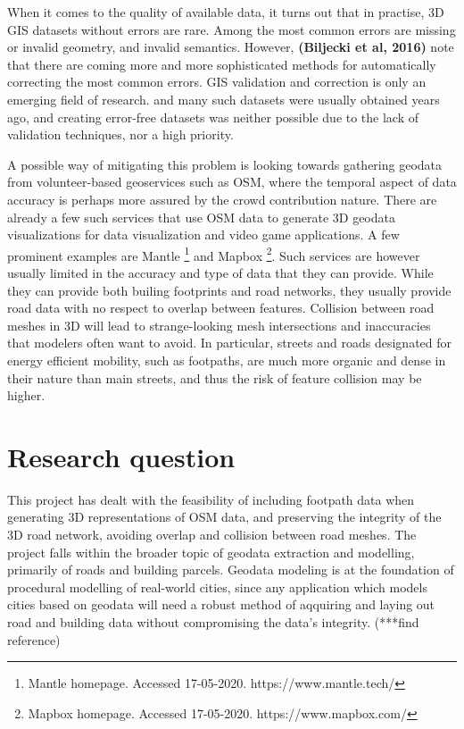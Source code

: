 \documentclass{kththesis}
\begin{document}
When it comes to the quality of available data, it turns out that in practise, 3D GIS datasets without errors are rare.
Among the most common errors are missing or invalid geometry, and invalid semantics.
However, \textbf{(Biljecki et al, 2016)} note that there are coming more and more sophisticated methods for automatically correcting the most common errors.
GIS validation and correction is only an emerging field of research.
and many such datasets were usually obtained years ago, and creating error-free datasets was neither possible due to the lack of validation techniques, nor a high priority.

A possible way of mitigating this problem is looking towards gathering geodata from volunteer-based geoservices such as OSM, where the temporal aspect of data accuracy is perhaps more assured by the crowd contribution nature.
There are already a few such services that use OSM data to generate 3D geodata visualizations for data visualization and video game applications.
A few prominent examples are Mantle
\footnote{Mantle homepage. Accessed 17-05-2020. https://www.mantle.tech/}
and Mapbox
\footnote{Mapbox homepage. Accessed 17-05-2020. https://www.mapbox.com/}.
Such services are however usually limited in the accuracy and type of data that they can provide.
While they can provide both builing footprints and road networks, they usually provide road data with no respect to overlap between features.
Collision between road meshes in 3D will lead to strange-looking mesh intersections and inaccuracies that modelers often want to avoid.
In particular, streets and roads designated for energy efficient mobility, such as footpaths, are much more organic and dense in their nature than main streets, and thus the risk of feature collision may be higher.

\section{Research question}

This project has dealt with the feasibility of including footpath data when generating 3D representations of OSM data, and preserving the integrity of the 3D road network, avoiding overlap and collision between road meshes.
The project falls within the broader topic of geodata extraction and modelling, primarily of roads and building parcels.
Geodata modeling is at the foundation of procedural modelling of real-world cities, since any application which models cities based on geodata will need a robust method of aqquiring and laying out road and building data without compromising the data's integrity. (***find reference)
\end{document}
